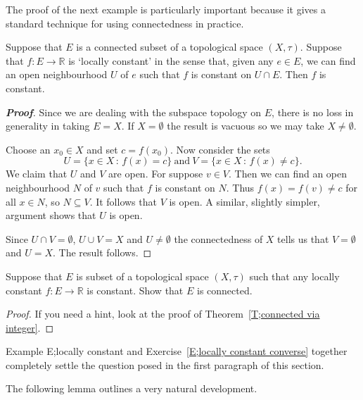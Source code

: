 The proof of the next example is particularly
important because it gives a standard technique
for using connectedness in practice.



\begin{theorem}\label{T;locally constant}
Suppose that $E$ is a connected subset of a topological
space $(X,\tau)$. Suppose that $f:E\rightarrow{\mathbb R}$
is `locally constant' in the sense that, given any
$e\in E$, we can find an open neighbourhood $U$ of $e$
such that $f$ is constant on $U\cap E$. Then $f$
is constant.
\end{theorem}
\begin{proof}[\bf Proof] Since we are dealing with the subspace
topology on $E$, there is no loss in generality
in taking $E=X$. If  $X=\emptyset$ the result is vacuous
so we may take $X\neq\emptyset$.

Choose an $x_{0}\in X$ and set $c=f(x_{0})$.
Now consider the sets
\[U=\{x\in X\,:\,f(x)=c\}\ \text{and}
\ V=\{x\in X\,:\,f(x)\neq c\}.\]
We claim that $U$ and $V$ are open.
For suppose $v\in V$.
Then we can find an open neighbourhood $N$
of $v$ such that $f$ is constant on $N$. Thus $f(x)=f(v)\neq c$
for all $x\in N$, so $N\subseteq V$. It follows that $V$
is open. A similar, slightly simpler, argument shows that $U$ is open.

Since $U\cap V=\emptyset$, $U\cup V=X$ and $U\neq \emptyset$ the connectedness of $X$ tells us that $V=\emptyset$ and $U=X$. The result follows.
\end{proof}



\begin{problem}\label{E;locally constant converse}
Suppose that $E$ is subset of a topological
space $(X,\tau)$ such that any locally constant
$f:E\rightarrow{\mathbb R}$ is constant.
Show that $E$ is connected.
\end{problem}
\begin{proof} If you need a hint, look at the proof of Theorem~\ref{T;connected via integer}.
\end{proof}



Example E;locally constant and
Exercise~\ref{E;locally constant converse} together
completely settle the question posed in the first paragraph
of this section.

The following lemma outlines a very natural development.


